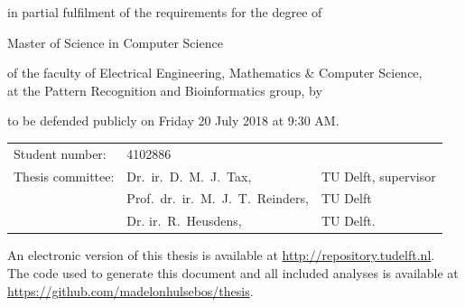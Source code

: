\begin{titlepage}


\begin{center}

{\makeatletter

\largetitlestyle\fontsize{46}{46}\selectfont\@title
\makeatother}

{\makeatletter
\ifx\@subtitle\undefined\else
    \bigskip
   {\tudsffamily\fontsize{28}{30}\selectfont\@subtitle}    
\fi
\makeatother}

\bigskip
\bigskip
\bigskip
\bigskip
\bigskip
\bigskip
\bigskip

in partial fulfilment of the requirements for the degree of 

\vfill

{\makeatletter
	\largetitlestyle\fontsize{16}{16}\selectfont Master of Science in Computer Science
\makeatother}


\vfill

of the faculty of Electrical Engineering, Mathematics \& Computer Science,\\
at the Pattern Recognition and Bioinformatics group, by

\vfill

{\makeatletter
	\largetitlestyle\fontsize{16}{16}\selectfont\@author
	\makeatother}

\vfill

to be defended publicly on Friday 20 July 2018 at 9:30 AM.

\bigskip
\bigskip
\bigskip
\bigskip
\bigskip
\bigskip
\bigskip

\begin{tabular}{lll}
    Student number: & 4102886 & \\
    Thesis committee: & Dr.\ ir.\ D.\ M.\ J.\ Tax, & TU Delft, supervisor \\
        & Prof.\ dr.\ ir.\ M.\ J.\ T.\  Reinders, & TU Delft \\
        & Dr. ir.\ R.\ Heusdens, & TU Delft. 
\end{tabular}

\vfill

An electronic version of this thesis is available at \url{http://repository.tudelft.nl}.\\
The code used to generate this document and all included analyses is available at \url{https://github.com/madelonhulsebos/thesis}.


\end{center}
\end{titlepage}
